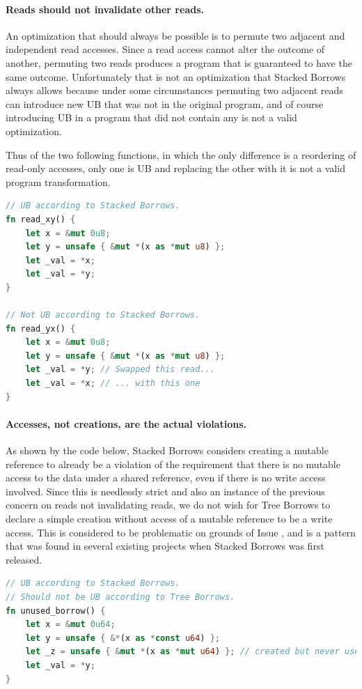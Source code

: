 \documentclass[a4paper,11pt]{article}
\theoremstyle{plain}
\theoremstyle{definition}
\theoremstyle{remark}
\begin{document}
\paragraph*{Reads should not invalidate other reads.}
An optimization that should always be possible is to permute two adjacent and independent
read accesses. Since a read access cannot alter the outcome of another, permuting
two reads produces a program that is guaranteed to have the same outcome.
Unfortunately that is not an optimization that Stacked Borrows always allows
because under some circumstances permuting two adjacent reads can introduce new
UB that was not in the original program, and of course introducing UB in a program
that did not contain any is not a valid optimization.

Thus of the two following functions, in which the only difference is a reordering
of read-only accesses, only one is UB and replacing the other with it is not
a valid program transformation.
\begin{lstlisting}[language=rust]
// UB according to Stacked Borrows.
fn read_xy() {
    let x = &mut 0u8;
    let y = unsafe { &mut *(x as *mut u8) };
    let _val = *x;
    let _val = *y;
}

// Not UB according to Stacked Borrows.
fn read_yx() {
    let x = &mut 0u8;
    let y = unsafe { &mut *(x as *mut u8) };
    let _val = *y; // Swapped this read...
    let _val = *x; // ... with this one
}
\end{lstlisting}

\paragraph*{Accesses, not creations, are the actual violations.}
As shown by the code below, Stacked Borrows considers creating a mutable reference
to already be a violation of the requirement that there is no mutable access to
the data under a shared reference, even if there is no write access involved.
Since this is needlessly strict and also an instance of the previous concern on
reads not invalidating reads, we do not wish for Tree Borrows to declare a simple
creation without access of a mutable reference to be a write access.
This is considered to be problematic on grounds of
Issue \cite{issue_uniqueness_early}, and is a pattern that was found in
several existing projects when Stacked Borrows was first released.
\begin{lstlisting}[language=rust]
// UB according to Stacked Borrows.
// Should not be UB according to Tree Borrows.
fn unused_borrow() {
    let x = &mut 0u64;
    let y = unsafe { &*(x as *const u64) };
    let _z = unsafe { &mut *(x as *mut u64) }; // created but never used
    let _val = *y;
}
\end{lstlisting}
\end{document}
